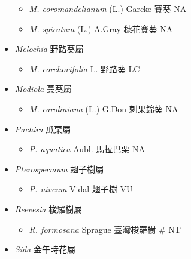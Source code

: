 \begin{itemize}
  \begin{itemize}
        \item[] \textit{M. coromandelianum} (L.) Garcke  賽葵   NA
        \item[] \textit{M. spicatum} (L.) A.Gray  穗花賽葵   NA
  \end{itemize}
 \item[] \textit{Melochia} 野路葵屬
                                
  \begin{itemize}
        \item[] \textit{M. corchorifolia} L.  野路葵   LC
  \end{itemize}
 \item[] \textit{Modiola} 蔓葵屬
                                
  \begin{itemize}
        \item[] \textit{M. caroliniana} (L.) G.Don  刺果錦葵   NA
  \end{itemize}
 \item[] \textit{Pachira} 瓜栗屬
                                
  \begin{itemize}
        \item[] \textit{P. aquatica} Aubl.  馬拉巴栗   NA
  \end{itemize}
 \item[] \textit{Pterospermum} 翅子樹屬
                                
  \begin{itemize}
        \item[] \textit{P. niveum} Vidal  翅子樹   VU
  \end{itemize}
 \item[] \textit{Reevesia} 梭羅樹屬
                                
  \begin{itemize}
        \item[] \textit{R. formosana} Sprague  臺灣梭羅樹  \# NT
  \end{itemize}
 \item[] \textit{Sida} 金午時花屬
                                

\end{itemize}
